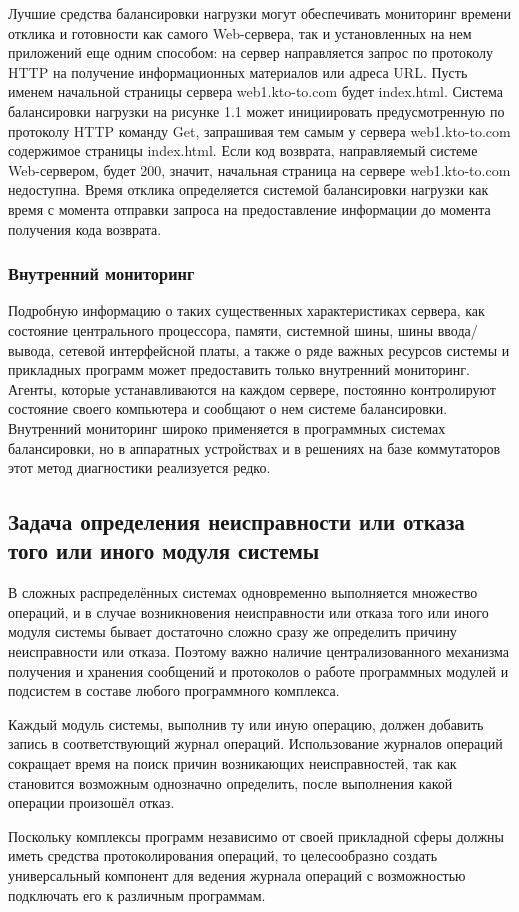 Лучшие средства балансировки нагрузки могут обеспечивать мониторинг времени отклика и готовности как самого Web-сервера, так и установленных на нем приложений еще одним способом: на сервер направляется запрос по протоколу HTTP на получение информационных материалов или адреса URL. Пусть именем начальной страницы сервера web1.kto-to.com будет index.html. Система балансировки нагрузки на рисунке 1.1 может инициировать предусмотренную по протоколу HTTP команду Get, запрашивая тем самым у сервера web1.kto-to.com содержимое страницы index.html. Если код возврата, направляемый системе Web-сервером, будет 200, значит, начальная страница на сервере web1.kto-to.com недоступна. Время отклика определяется системой балансировки нагрузки как время с момента отправки запроса на предоставление информации до момента получения кода возврата.

\subsubsection{Внутренний мониторинг}

Подробную информацию о таких существенных характеристиках сервера, как состояние центрального процессора, памяти, системной шины, шины ввода/вывода, сетевой интерфейсной платы, а также о ряде важных ресурсов системы и прикладных программ  может предоставить только внутренний мониторинг. Агенты, которые устанавливаются на каждом сервере, постоянно контролируют состояние своего компьютера и сообщают о нем системе балансировки. Внутренний мониторинг широко применяется в программных системах балансировки, но в аппаратных устройствах и в решениях на базе коммутаторов этот метод диагностики реализуется редко.

\subsection{Задача определения неисправности или отказа того или иного модуля системы}

В сложных распределённых системах одновременно выполняется множество операций, и в случае возникновения неисправности или отказа того или иного модуля системы бывает достаточно сложно сразу же определить причину неисправности или отказа. Поэтому важно наличие централизованного механизма получения и хранения сообщений и протоколов о работе программных модулей и подсистем в составе любого программного комплекса.

Каждый модуль системы, выполнив ту или иную операцию, должен добавить запись в соответствующий журнал операций. Использование журналов операций сокращает время на поиск причин возникающих неисправностей, так как становится возможным однозначно определить, после выполнения какой операции произошёл отказ.

Поскольку комплексы программ независимо от своей прикладной сферы должны иметь средства протоколирования операций, то целесообразно создать универсальный компонент для ведения журнала операций с возможностью подключать его к различным программам.

\newpage
